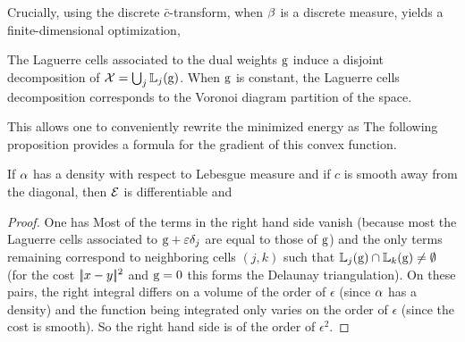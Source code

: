Crucially, using the discrete $\bar c$-transform, when $\beta$ is a discrete measure, yields a finite-dimensional optimization, 

The Laguerre cells associated to the dual weights $\mathrm{g}$
induce a disjoint decomposition of $\mathcal{X} = \bigcup_j \mathbb{L}_{j}(\mathrm{g})$. When $\mathrm{g}$ is constant, the Laguerre cells decomposition corresponds to the Voronoi diagram partition of the space. 
%

This allows one to conveniently rewrite the minimized energy as
The following proposition provides a formula for the gradient of this convex function.

\begin{prop}
If $\alpha$ has a density with respect to Lebesgue measure and if $c$ is smooth away from the diagonal, then $\mathcal{E}$ is differentiable and
\end{prop}
\begin{proof} 
	One has
	Most of the terms in the right hand side vanish (because most the Laguerre cells associated to $\mathrm{g}+\varepsilon\delta_j$ are equal to those of $\mathrm{g}$) and the only terms remaining correspond to neighboring cells $(j,k)$ such that 
	$\mathbb{L}_{j}(\mathrm{g}) \cap \mathbb{L}_{k}(\mathrm{g}) \neq \emptyset$ (for the cost $|\!| x-y |\!|^2$ and $\mathrm{g}=0$ this forms the Delaunay triangulation).
	On these pairs, the right integral differs on a volume of the order of $\epsilon$ (since $\alpha$ has a density) and the function being integrated only varies on the order of $\epsilon$ (since the cost is smooth). So the right hand side is of the order of $\epsilon^2$.
\end{proof}

